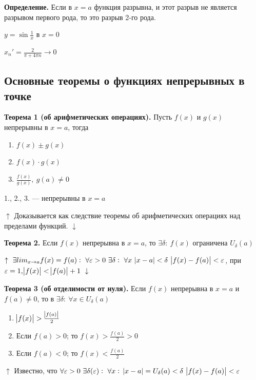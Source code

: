 \documentclass{article}
\begin{document}
    \textbf{Определение.} Если в \(x=a\) функция разрывна, и этот разрыв не является разрывом первого рода, то это разрыв 2-го рода.

    \(y = \sin \frac{1}{x}\) в \(x=0\)

    \(x_n'=\frac{2}{\pi+4\pi n} \rightarrow 0\)

    \subsection{Основные теоремы о функциях непрерывных в точке}

    \textbf{Теорема 1 (об арифметических операциях).} Пусть \(f(x)\) и \(g(x)\) непрерывны в \(x = a\), тогда 

    \begin{enumerate}
        \item \( f(x) \pm g(x) \)
        \item \( f(x) \cdot g(x) \)
        \item \( \frac{f(x)}{g(x)},\ g(a) \neq 0 \)
    \end{enumerate}
    
    1., 2., 3. --- непрерывны в \(x=a\)

    \(\uparrow\) Доказывается как следствие теоремы об арифметических операциях над пределами функций. \(\downarrow\)

    \textbf{Теорема 2.} Если \(f(x)\) непрерывна в \(x = a\), то \(\exists \delta:\ f(x)\) ограничена \(U_{\delta}(a)\)
    
    \(\uparrow\ \exists lim_{x \rightarrow a} f(x)=f(a):\ \forall \varepsilon > 0\ \exists \delta:\ \forall x\ \abs{x-a}<\delta\ \abs{f(x)-f(a)} < \varepsilon\), при \(\varepsilon = 1, \abs{f(x)}<\abs{f(a)}+1\ \downarrow\)


    \textbf{Теорема 3 (об отделимости от нуля).} Если \(f(x)\) непрерывна в \(x = a\) и \( f(a) \neq 0 \), то в \(\exists \delta:\ \forall x \in U_{\delta}(a)\)

    \begin{enumerate}
        \item \(\abs{f(x)}>\frac{\abs{f(a)}}{2}\)
        \item Если \(f(a)>0\); то \(f(x)>\frac{f(a)}{2}>0\)
        \item Если \(f(a)<0\); то \(f(x)<\frac{f(a)}{2}\)
    \end{enumerate}

    \(\uparrow\) Известно, что \(\forall \varepsilon > 0\ \exists \delta(\varepsilon):\ \forall x:\ \abs{x-a}=U_\delta(a)<\delta\ \abs{f(x)-f(a)}<\varepsilon\)
\end{document}
